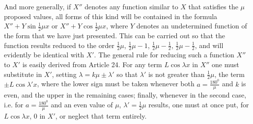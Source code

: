 And more generally, if $X''$ denotes any function similar to $X$ that satisfies the $\mu$ proposed values, all forms of this kind will be contained in the formula $X''+Y\sin\frac12\mu x$ or $X''+Y\cos\frac12\mu x$, where $Y$ denotes an undetermined function of the form that we have just presented. This can be carried out so that the function results reduced to the order $\frac12\mu$, $\frac12\mu-1$, $\frac12\mu-\frac12$, $\frac12\mu-\frac12$, and will evidently be identical with $X'$. The general rule for reducing such a function $X''$ to $X'$ is easily derived from Article 24. For any term $L\cos\lambda x$ in $X''$ one must substitute in $X'$, setting $\lambda=k\mu\pm\lambda'$ so that $\lambda'$ is not greater than $\frac12\mu$, the term $\pm L\cos\lambda'x$, where the lower sign must be taken whenever both $a=\frac{180^{{\mathord{0}}}}{\mu}$ and $k$ is even, and the upper in the remaining cases; finally, whenever in the second case, i.e. for $a=\frac{180^{{\mathord{0}}}}{\mu}$ and an even value of $\mu$, $\lambda'=\frac12\mu$ results, one must at once put, for $L\cos\lambda x$, $0$ in $X'$, or neglect that term entirely.

\endgroup
